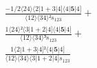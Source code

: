\documentclass[varwidth, border=5pt]{standalone}
\begin{document}
\begin{my}
$\begin{gathered}
\scriptscriptstyle\frac{-1/2⟨24⟩⟨2|1+3|4]⟨4|𝟓|4]}{⟨12⟩⟨34⟩²s_{123}} +\\
\scriptscriptstyle\frac{1⟨24⟩²⟨3|1+2|4]⟨4|𝟓|4]}{⟨12⟩⟨34⟩³s_{123}} +\\
\scriptscriptstyle\frac{1⟨2|1+3|4]²⟨4|𝟓|4]}{⟨12⟩⟨34⟩⟨3|1+2|4]s_{123}} \phantom{+}
\end{gathered}$
\end{my}
\end{document}

